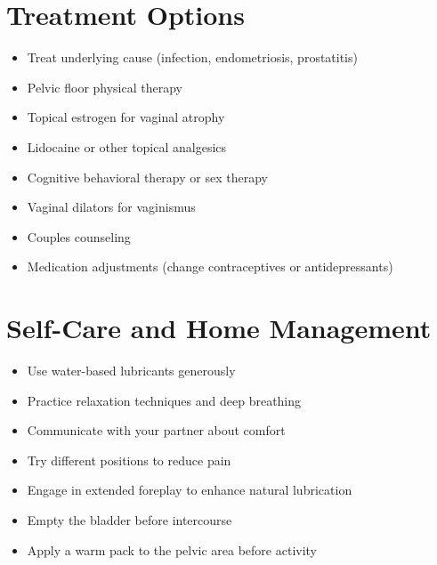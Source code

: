\section*{Treatment Options}
\begin{itemize}
\item Treat underlying cause (infection, endometriosis, prostatitis)
\item Pelvic floor physical therapy
\item Topical estrogen for vaginal atrophy
\item Lidocaine or other topical analgesics
\item Cognitive behavioral therapy or sex therapy
\item Vaginal dilators for vaginismus
\item Couples counseling
\item Medication adjustments (change contraceptives or antidepressants)
\end{itemize}

\section*{Self-Care and Home Management}
\begin{itemize}
\item Use water-based lubricants generously
\item Practice relaxation techniques and deep breathing
\item Communicate with your partner about comfort
\item Try different positions to reduce pain
\item Engage in extended foreplay to enhance natural lubrication
\item Empty the bladder before intercourse
\item Apply a warm pack to the pelvic area before activity
\end{itemize}

